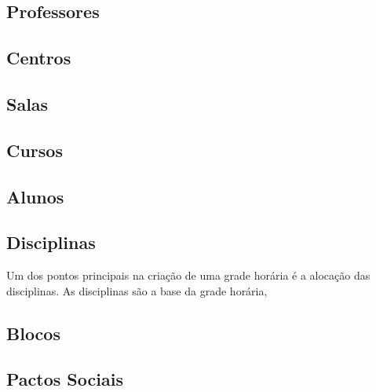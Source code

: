 
\subsection{Professores}


\subsection{Centros}

\subsection{Salas}

\subsection{Cursos}

\subsection{Alunos}

\subsection{Disciplinas} %

Um dos pontos principais na criação de uma grade horária é a alocação das disciplinas. As disciplinas são a base da grade horária,


\subsection{Blocos}


\subsection{Pactos Sociais}

